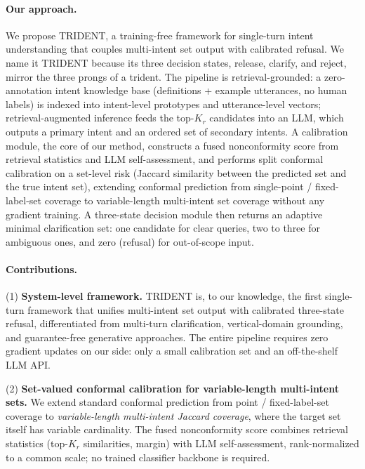 \documentclass[sigconf, anonymous, review]{acmart}
\begin{document}
\paragraph{Our approach.}
We propose TRIDENT, a training-free framework for single-turn intent understanding that couples multi-intent set output with calibrated refusal. We name it TRIDENT because its three decision states, release, clarify, and reject, mirror the three prongs of a trident. The pipeline is retrieval-grounded: a zero-annotation intent knowledge base (definitions + example utterances, no human labels) is indexed into intent-level prototypes and utterance-level vectors; retrieval-augmented inference feeds the top-$K_r$ candidates into an LLM, which outputs a primary intent and an ordered set of secondary intents. A calibration module, the core of our method, constructs a fused nonconformity score from retrieval statistics and LLM self-assessment, and performs split conformal calibration on a set-level risk (Jaccard similarity between the predicted set and the true intent set), extending conformal prediction from single-point / fixed-label-set coverage to variable-length multi-intent set coverage without any gradient training. A three-state decision module then returns an adaptive minimal clarification set: one candidate for clear queries, two to three for ambiguous ones, and zero (refusal) for out-of-scope input.

\paragraph{Contributions.}
(1) \textbf{System-level framework.} TRIDENT is, to our knowledge, the first single-turn framework that unifies multi-intent set output with calibrated three-state refusal, differentiated from multi-turn clarification, vertical-domain grounding, and guarantee-free generative approaches. The entire pipeline requires zero gradient updates on our side: only a small calibration set and an off-the-shelf LLM API.

(2) \textbf{Set-valued conformal calibration for variable-length multi-intent sets.} We extend standard conformal prediction from point / fixed-label-set coverage to \emph{variable-length multi-intent Jaccard coverage}, where the target set itself has variable cardinality. The fused nonconformity score combines retrieval statistics (top-$K_r$ similarities, margin) with LLM self-assessment, rank-normalized to a common scale; no trained classifier backbone is required.
\end{document}

